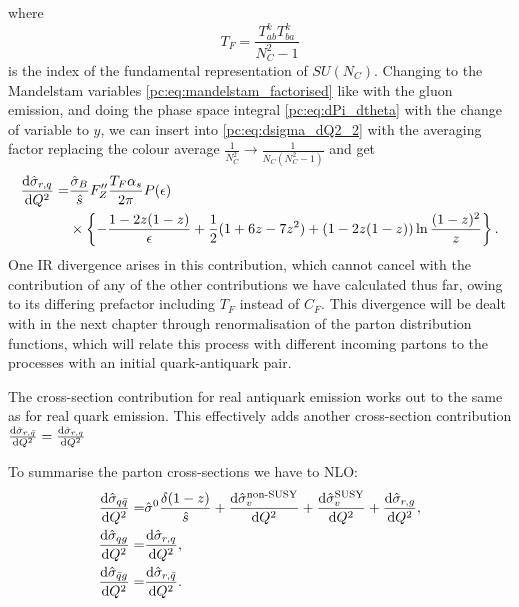 \documentclass[../main.tex]{subfiles}
\begin{document}
where
\begin{equation}
  T_F = \frac{T^k_{ab} T^{k}_{ba}}{N_C^2-1}
\end{equation}
is the index of the fundamental representation of \(SU(N_C)\).
Changing to the Mandelstam variables \cref{pc:eq:mandelstam_factorised} like with the gluon emission, and doing the phase space integral \cref{pc:eq:dPi_dtheta} with the change of variable to \(y\), we can insert into \cref{pc:eq:dsigma_dQ2_2} with the averaging factor replacing the colour average \(\frac{1}{N_C^2} \to \frac{1}{N_C(N_C^2-1)}\) and get
\begin{align}
  \label{pc:eq:sigma_rq}
  \nonumber
  \d[Q^2]{\hat\sigma_{r,q}} = & \frac{\hat\sigma_B}{\hat{s}} F^{\prime\prime}_Z \frac{T_F \alpha_s}{2\pi} P(\epsilon)                    \\
                              & \times \cclosed{-\frac{1-2z(1-z)}{\epsilon} + \frac{1}{2}(1+6z-7z^2) + (1-2z(1-z))\ln\frac{(1-z)^2}{z}}.
\end{align}
One IR divergence arises in this contribution, which cannot cancel with the contribution of any of the other contributions we have calculated thus far, owing to its differing prefactor including \(T_F\) instead of \(C_F\).
This divergence will be dealt with in the next chapter through renormalisation of the parton distribution functions, which will relate this process with different incoming partons to the processes with an initial quark-antiquark pair.

The cross-section contribution for real antiquark emission works out to the same as for real quark emission.
This effectively adds another cross-section contribution \(\d[Q^2]{\hat\sigma_{r,\bar{q}}} = \d[Q^2]{\hat\sigma_{r,q}}\)
\medskip

To summarise the parton cross-sections we have to NLO\@:
\begin{subequations}
  \label{pc:eq:all_NLO_contributions}
  \begin{align}
    \d[Q^2]{\hat\sigma_{q\bar{q}}} = & \hat\sigma^0 \frac{\delta(1-z)}{\hat{s}} + \d[Q^2]{\hat\sigma_v^\text{non-SUSY}} + \d[Q^2]{\hat\sigma_{v}^\text{SUSY}} + \d[Q^2]{\hat\sigma_{r,g}}, \\
    \d[Q^2]{\hat\sigma_{qg}} =       & \d[Q^2]{\hat\sigma_{r,q}},                                                                                                                          \\
    \d[Q^2]{\hat\sigma_{\bar{q}g}} = & \d[Q^2]{\hat\sigma_{r,\bar{q}}}.
  \end{align}
\end{subequations}
\end{document}
